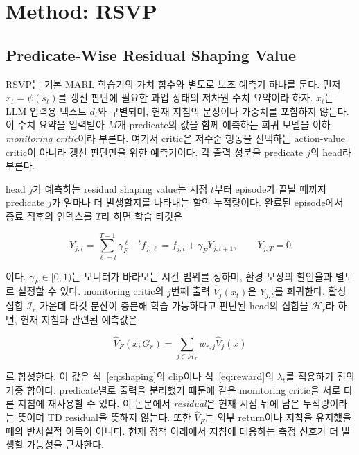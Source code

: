 \section{Method: RSVP}

\subsection{Predicate-Wise Residual Shaping Value}

RSVP는 기본 MARL 학습기의 가치 함수와 별도로 보조 예측기 하나를 둔다. 먼저
$x_t=\psi(s_t)$를 갱신 판단에 필요한 과업 상태의 저차원 수치 요약이라 하자.
$x_t$는 LLM 입력용 텍스트 $d_t$와 구별되며, 현재 지침의 문장이나 가중치를 포함하지
않는다. 이 수치 요약을 입력받아 $M$개 predicate의 값을 함께 예측하는 회귀 모델을
이하 \emph{monitoring critic}이라 부른다. 여기서 critic은 저수준 행동을 선택하는
action-value critic이 아니라 갱신 판단만을 위한 예측기이다. 각 출력 성분을 predicate
$j$의 head라 부른다.

head $j$가 예측하는 residual shaping value는 시점 $t$부터 episode가 끝날 때까지
predicate $j$가 얼마나 더 발생할지를 나타내는 할인 누적량이다. 완료된 episode에서
종료 직후의 인덱스를 $T$라 하면 학습 타깃은

\begin{equation}
Y_{j,t}=\sum_{\ell=t}^{T-1}\gamma_F^{\ell-t}f_{j,\ell}
=f_{j,t}+\gamma_FY_{j,t+1},\qquad Y_{j,T}=0
\label{eq:critic-target}
\end{equation}

이다. $\gamma_F\in[0,1)$는 모니터가 바라보는 시간 범위를 정하며, 환경 보상의
할인율과 별도로 설정할 수 있다. monitoring critic의 $j$번째 출력
$\widehat V_j(x_t)$은 $Y_{j,t}$를 회귀한다. 활성 집합 $\mathcal I_r$ 가운데 타깃
분산이 충분해 학습 가능하다고 판단된 head의 집합을 $\mathcal H_r$라 하면, 현재
지침과 관련된 예측값은

\begin{equation}
\widehat V_F(x;G_r)=
\sum_{j\in\mathcal H_r}w_{r,j}\widehat V_j(x)
\label{eq:guidance-value}
\end{equation}

로 합성한다. 이 값은 식~\eqref{eq:shaping}의 clip이나 식~\eqref{eq:reward}의
$\lambda_t$를 적용하기 전의 가중 합이다. predicate별로 출력을 분리했기 때문에 같은
monitoring critic을 서로 다른 지침에 재사용할 수 있다. 이 논문에서 \emph{residual}은
현재 시점 뒤에 남은 누적량이라는 뜻이며 TD residual을 뜻하지 않는다. 또한
$\widehat V_F$는 외부 return이나 지침을 유지했을 때의 반사실적 이득이 아니다. 현재
정책 아래에서 지침에 대응하는 측정 신호가 더 발생할 가능성을 근사한다.

